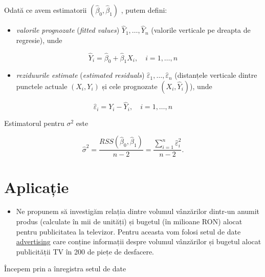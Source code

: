 \documentclass[]{article}
\providecommand{\tightlist}{%
  \setlength{\itemsep}{0pt}\setlength{\parskip}{0pt}}
\newenvironment{frshaded*}{%
  \def\FrameCommand{\fboxrule=\FrameRule\fboxsep=\FrameSep \fcolorbox{framecolor}{shadecolor1}}%
  \MakeFramed {\advance\hsize-\width \FrameRestore}}%
{\endMakeFramed}
\newenvironment{rmdblock}[1]
  {\begin{frshaded*}
  \begin{itemize}
  \renewcommand{\labelitemi}{
    \raisebox{-.7\height}[0pt][0pt]{
      {\setkeys{Gin}{width=2em,keepaspectratio}\texttt{[image: images/icons/\#1]}}
    }
  }
  \item
  }
  {
  \end{itemize}
  \end{frshaded*}
  }
\newenvironment{rmdexercise}
  {\begin{rmdblock}{exercise}}
  {\end{rmdblock}}
\begin{document}
Odată ce avem estimatorii \((\hat\beta_0,\hat\beta_1)\) , putem defini:

\begin{itemize}
\tightlist
\item
  \emph{valorile prognozate} (\emph{fitted values})
  \(\hat Y_1,\ldots,\hat Y_n\) (valorile verticale pe dreapta de
  regresie), unde
\end{itemize}

\[
\hat Y_i=\hat\beta_0+\hat\beta_1X_i,\quad i=1,\ldots,n
\]

\begin{itemize}
\tightlist
\item
  \emph{reziduurile estimate} (\emph{estimated residuals})
  \(\hat \varepsilon_1,\ldots,\hat \varepsilon_n\) (distanțele verticale
  dintre punctele actuale \((X_i,Y_i)\) și cele prognozate
  \((X_i,\hat Y_i)\)), unde
\end{itemize}

\[
\hat\varepsilon_i=Y_i-\hat Y_i,\quad i=1,\ldots,n
\]

Estimatorul pentru \(\sigma^2\) este

\[
\hat{\sigma}^2 = \frac{RSS(\hat{\beta}_0,\hat{\beta}_1)}{n-2} = \frac{\sum_{i=1}^{n}\hat{\varepsilon}_i^2}{n-2}.
\]

\section{Aplicație}\label{aplicatie}

\begin{rmdexercise}
Ne propunem să investigăm relația dintre volumul vânzărilor dintr-un
anumit produs (calculate în mii de unități) și bugetul (în milioane RON)
alocat pentru publicitatea la televizor. Pentru aceasta vom folosi setul
de date \href{dataIn/advertising.csv}{advertising} care conține
informații despre volumul vânzărilor și bugetul alocat publicității TV
în 200 de piețe de desfacere.
\end{rmdexercise}

Începem prin a înregistra setul de date
\end{document}
